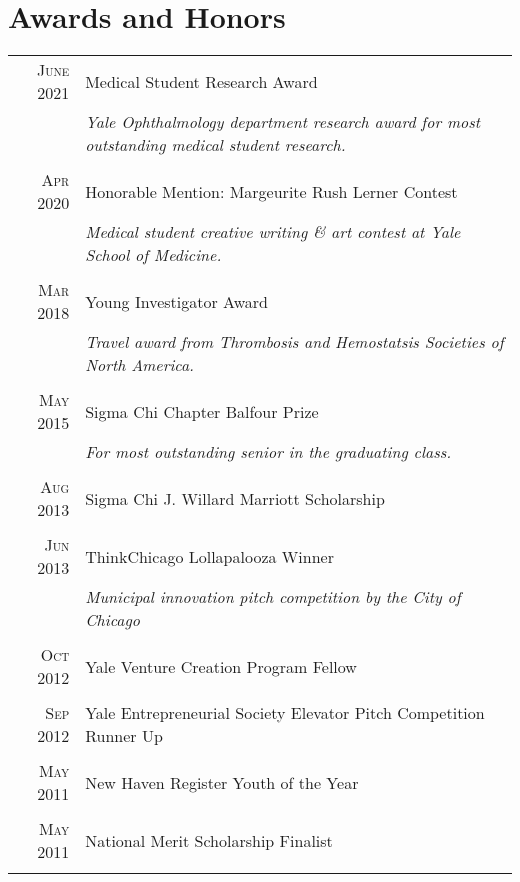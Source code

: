 \documentclass[a4paper,10pt]{article}
\begin{document}
\section{Awards and Honors}
\begin{tabular}{rp{11cm}}
 \textsc{June} 2021 & Medical Student Research Award \\
 							    & \small\emph{Yale Ophthalmology department research award for most outstanding medical student research.} \\
 \multicolumn{2}{c}{} \\
 \textsc{Apr} 2020 & Honorable Mention: Margeurite Rush Lerner Contest \\
 							    & \small\emph{Medical student creative writing \& art contest at Yale School of Medicine.} \\
 \multicolumn{2}{c}{} \\
 \textsc{Mar} 2018 & Young Investigator Award \\
 							    & \small\emph{Travel award from Thrombosis and Hemostatsis Societies of North America.} \\
 \multicolumn{2}{c}{} \\
 \textsc{May} 2015 & Sigma Chi Chapter Balfour Prize \\
 							    & \small\emph{For most outstanding senior in the graduating class.} \\
 \multicolumn{2}{c}{} \\
 \textsc{Aug} 2013 & Sigma Chi J. Willard Marriott Scholarship \\
 \multicolumn{2}{c}{} \\
 \textsc{Jun} 2013 & ThinkChicago Lollapalooza Winner \\
 							    & \small\emph{Municipal innovation pitch competition by the City of Chicago} \\
 \multicolumn{2}{c}{} \\
 \textsc{Oct} 2012 & Yale Venture Creation Program Fellow \\
 \multicolumn{2}{c}{} \\	
 \textsc{Sep} 2012 & Yale Entrepreneurial Society Elevator Pitch Competition Runner Up \\
 \multicolumn{2}{c}{} \\
 \textsc{May} 2011 & New Haven Register Youth of the Year \\
 \multicolumn{2}{c}{} \\
 \textsc{May} 2011 & National Merit Scholarship Finalist \\
 \multicolumn{2}{c}{} \\
\end{tabular}
\end{document}
